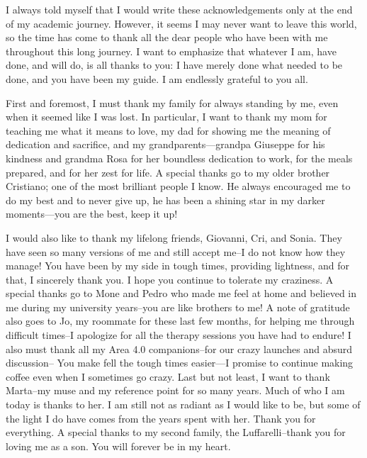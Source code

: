I always told myself that I would write these acknowledgements only at the end of my academic journey.
 However, it seems I may never want to leave this world, 
 so the time has come to thank all the dear people who have been with me throughout this long journey. 
 I want to emphasize that whatever I am, have done, and will do, is all thanks to you: 
 I have merely done what needed to be done, and you have been my guide. 
 I am endlessly grateful to you all.

First and foremost, 
 I must thank my family for always standing by me, 
 even when it seemed like I was lost. 
 In particular, I want to thank my mom for teaching me what it means to love, 
 my dad for showing me the meaning of dedication and sacrifice, 
 and my grandparents—grandpa Giuseppe for his kindness and grandma Rosa for her boundless dedication to work, for the meals prepared, and for her zest for life. 
 A special thanks go to my older brother Cristiano; 
 one of the most brilliant people I know.
 He always encouraged me to do my best and to never give up, 
 he has been a shining star in my darker moments—you are the best, keep it up!

I would also like to thank my lifelong friends, 
 Giovanni, Cri, and Sonia. 
 They have seen so many versions of me and still accept me--I do not know how they manage! 
 You have been by my side in tough times, providing lightness, and for that, I sincerely thank you. 
 I hope you continue to tolerate my craziness.
%
A special thanks go to Mone and Pedro who made me feel at home and believed in me during my university years--you are like brothers to me! 
%
A note of gratitude also goes to Jo, 
 my roommate for these last few months, 
 for helping me through difficult times--I apologize for all the therapy sessions you have had to endure!
%
I also must thank all my Area 4.0 companions--for our crazy launches and absurd discussion--
You make fell the tough times easier---I promise to continue making coffee even when I sometimes go crazy.
%
Last but not least, I want to thank Marta--my muse and my reference point for so many years. 
 Much of who I am today is thanks to her. 
 I am still not as radiant as I would like to be,
 but some of the light I do have comes from the years spent with her. 
 Thank you for everything.
%
A special thanks to my second family, the Luffarelli--thank you for loving me as a son. 
 You will forever be in my heart.
%


